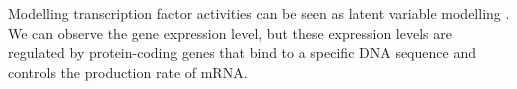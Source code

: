 

Modelling transcription factor activities can be seen as latent variable modelling \cite{Bishop:1999, Lawrence:2005}. We can observe the gene expression level, but these expression levels are regulated by protein-coding genes that bind to a specific DNA sequence and controls the production rate of mRNA. %

